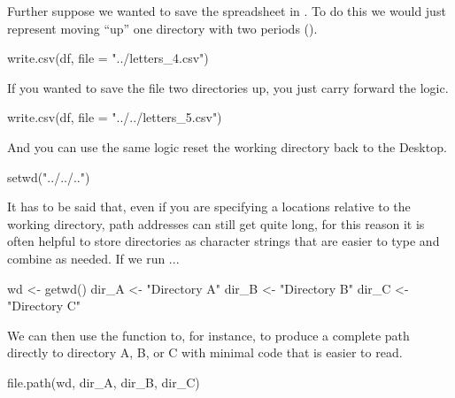 \medskip

Further suppose we wanted to save the spreadsheet in .  To do this we would just represent moving ``up'' one directory with two periods ().

\begin{inR}
write.csv(df, file = "../letters_4.csv")
\end{inR}

\vspace{2em}


\noindent
If you wanted to save the file two directories up, you just carry forward the logic.

\begin{inR}
write.csv(df, file = "../../letters_5.csv")
\end{inR}

\vspace{2em}


\noindent
And you can use the same logic reset the working directory back to the Desktop.

\begin{inR}
setwd("../../..")
\end{inR}

\medskip

It has to be said that, even if you are specifying a locations relative to the working directory, path addresses can still get quite long, for this reason it is often helpful to store directories as character strings that are easier to type and combine as needed. If we run ...

\begin{inR}
wd <- getwd()
dir_A <- "Directory A"
dir_B <- "Directory B"
dir_C <- "Directory C"
\end{inR}

\medskip

\noindent
We can then use the  function to, for instance, to produce a complete path directly to directory A, B, or C with minimal code that is easier to read.

\begin{inR}
file.path(wd, dir_A, dir_B, dir_C)
\end{inR}


